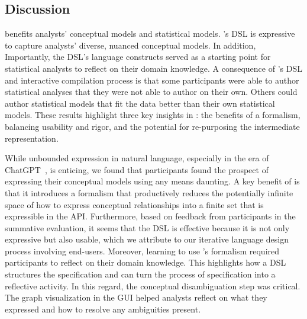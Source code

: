 \subsection{Discussion}
\rTisane benefits analysts' conceptual models and statistical models. \rTisane's
DSL is expressive to capture analysts' diverse, nuanced conceptual models. In
addition, Importantly, the DSL's language constructs served as a starting point
for statistical analysts to reflect on their domain knowledge. A consequence of
\rTisane's DSL and interactive compilation process is that some participants
were able to author statistical analyses that they were not able to author on
their own. Others could author statistical models that fit the data better than
their own statistical models. These results highlight three key insights in
\rTisane: the benefits of a formalism, balancing usability and rigor, and the
potential for re-purposing the intermediate representation. 


While unbounded expression in natural language, especially in the era of
ChatGPT~\cite{brown2020language}, is enticing, we found that participants found
the prospect of expressing their conceptual models using any means daunting. A
key benefit of \rTisane is that it introduces a formalism that productively
reduces the potentially infinite space of how to express conceptual
relationships into a finite set that is expressible in the API. Furthermore,
based on feedback from participants in the summative evaluation, it seems that
the DSL is effective because it is not only expressive but also usable, which we
attribute to our iterative language design process involving end-users.
Moreover, learning to use \rTisane's formalism required participants to reflect
on their domain knowledge. This highlights how a DSL structures the
specification and can turn the process of specification into a reflective
activity. In this regard, the conceptual disambiguation step was critical. The
graph visualization in the GUI helped analysts reflect on what they expressed
and how to resolve any ambiguities present. 



